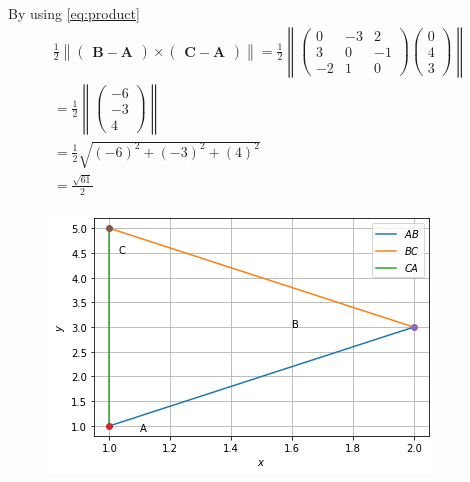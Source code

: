 \documentclass[12pt]{article}\usepackage{graphicx}
\newcommand{\myvec}[1]{\ensuremath{\begin{pmatrix}#1\end{pmatrix}}}
\let\vec\mathbf
\let\vec\mathbf
\providecommand{\norm}[1]{\left\lVert#1\right\rVert}
\begin{document}
\begin{enumerate}
By using \eqref{eq:product}
\begin{align}
          \frac{1}{2}\norm{\myvec{\vec{B-A}}\times\myvec{\vec{C-A}}}=\frac{1}{2}\norm{\myvec{0&-3&2\\3&0&-1\\-2&1&0}\myvec{0\\4\\3}}\\
          =\frac{1}{2}\norm{\myvec{-6\\-3\\4}}\\
          =\frac{1}{2}\sqrt{(-6)^2+(-3)^2+(4)^2}\\
          =\frac{\sqrt{61}}{2}
\end{align}
\begin{figure}[!h]
 \begin{center}
  \includegraphics[width=\columnwidth]{figs/fig.png}
 \end{center}
\caption{}
\label{fig:Fig1}
\end{figure}
\end{enumerate}
\end{document}
